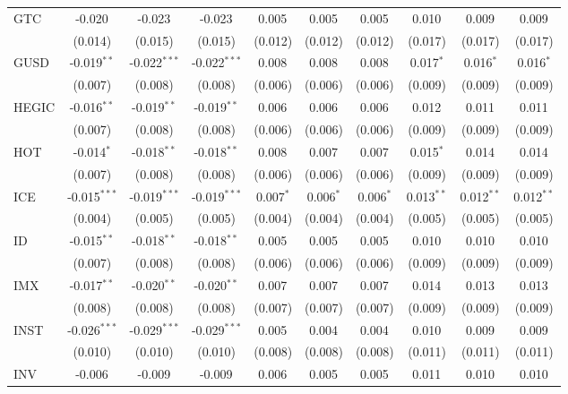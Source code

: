 \begin{table}[!htbp]
\begin{tabular}{@{\extracolsep{5pt}}lccccccccc}
 GTC & -0.020$^{}$ & -0.023$^{}$ & -0.023$^{}$ & 0.005$^{}$ & 0.005$^{}$ & 0.005$^{}$ & 0.010$^{}$ & 0.009$^{}$ & 0.009$^{}$ \\
  & (0.014) & (0.015) & (0.015) & (0.012) & (0.012) & (0.012) & (0.017) & (0.017) & (0.017) \\
 GUSD & -0.019$^{**}$ & -0.022$^{***}$ & -0.022$^{***}$ & 0.008$^{}$ & 0.008$^{}$ & 0.008$^{}$ & 0.017$^{*}$ & 0.016$^{*}$ & 0.016$^{*}$ \\
  & (0.007) & (0.008) & (0.008) & (0.006) & (0.006) & (0.006) & (0.009) & (0.009) & (0.009) \\
 HEGIC & -0.016$^{**}$ & -0.019$^{**}$ & -0.019$^{**}$ & 0.006$^{}$ & 0.006$^{}$ & 0.006$^{}$ & 0.012$^{}$ & 0.011$^{}$ & 0.011$^{}$ \\
  & (0.007) & (0.008) & (0.008) & (0.006) & (0.006) & (0.006) & (0.009) & (0.009) & (0.009) \\
 HOT & -0.014$^{*}$ & -0.018$^{**}$ & -0.018$^{**}$ & 0.008$^{}$ & 0.007$^{}$ & 0.007$^{}$ & 0.015$^{*}$ & 0.014$^{}$ & 0.014$^{}$ \\
  & (0.007) & (0.008) & (0.008) & (0.006) & (0.006) & (0.006) & (0.009) & (0.009) & (0.009) \\
 ICE & -0.015$^{***}$ & -0.019$^{***}$ & -0.019$^{***}$ & 0.007$^{*}$ & 0.006$^{*}$ & 0.006$^{*}$ & 0.013$^{**}$ & 0.012$^{**}$ & 0.012$^{**}$ \\
  & (0.004) & (0.005) & (0.005) & (0.004) & (0.004) & (0.004) & (0.005) & (0.005) & (0.005) \\
 ID & -0.015$^{**}$ & -0.018$^{**}$ & -0.018$^{**}$ & 0.005$^{}$ & 0.005$^{}$ & 0.005$^{}$ & 0.010$^{}$ & 0.010$^{}$ & 0.010$^{}$ \\
  & (0.007) & (0.008) & (0.008) & (0.006) & (0.006) & (0.006) & (0.009) & (0.009) & (0.009) \\
 IMX & -0.017$^{**}$ & -0.020$^{**}$ & -0.020$^{**}$ & 0.007$^{}$ & 0.007$^{}$ & 0.007$^{}$ & 0.014$^{}$ & 0.013$^{}$ & 0.013$^{}$ \\
  & (0.008) & (0.008) & (0.008) & (0.007) & (0.007) & (0.007) & (0.009) & (0.009) & (0.009) \\
 INST & -0.026$^{***}$ & -0.029$^{***}$ & -0.029$^{***}$ & 0.005$^{}$ & 0.004$^{}$ & 0.004$^{}$ & 0.010$^{}$ & 0.009$^{}$ & 0.009$^{}$ \\
  & (0.010) & (0.010) & (0.010) & (0.008) & (0.008) & (0.008) & (0.011) & (0.011) & (0.011) \\
 INV & -0.006$^{}$ & -0.009$^{}$ & -0.009$^{}$ & 0.006$^{}$ & 0.005$^{}$ & 0.005$^{}$ & 0.011$^{}$ & 0.010$^{}$ & 0.010$^{}$ \\

\end{tabular}
\end{table}
